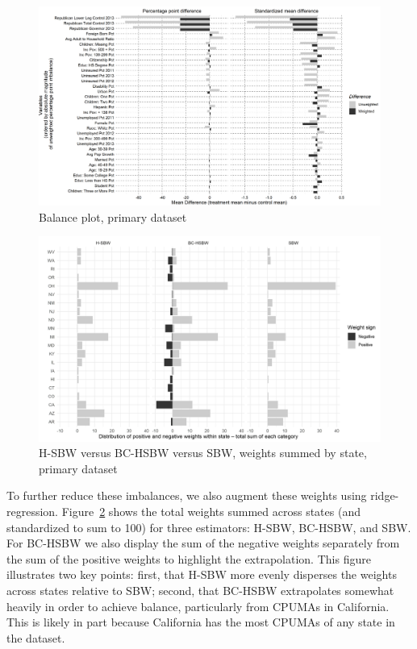 \documentclass[aoas]{imsart}
\theoremstyle{plain}
\theoremstyle{remark}
\begin{document}
\begin{figure}[H]
\begin{center}
    \caption{Balance plot, primary dataset}\label{fig:loveplotc1a}
    \includegraphics[scale=0.45]{01_Plots/balance-plot-all-etu-c1.png}
\end{center}
\end{figure}

\begin{figure}[H]
\begin{center}
    \caption{H-SBW versus BC-HSBW versus SBW, weights summed by state, primary dataset}
    \label{fig:sbwvhsbw1}
    \includegraphics[scale=0.55]{01_Plots/weights-by-state-sbw-hsbw-c1.png}
\end{center}
\end{figure}

To further reduce these imbalances, we also augment these weights using ridge-regression. Figure~\ref{fig:sbwvhsbw1} shows the total weights summed across states (and standardized to sum to 100) for three estimators: H-SBW, BC-HSBW, and SBW. For BC-HSBW we also display the sum of the negative weights separately from the sum of the positive weights to highlight the extrapolation. This figure illustrates two key points: first, that H-SBW more evenly disperses the weights across states relative to SBW; second, that BC-HSBW extrapolates somewhat heavily in order to achieve balance, particularly from CPUMAs in California. This is likely in part because California has the most CPUMAs of any state in the dataset.
\end{document}
